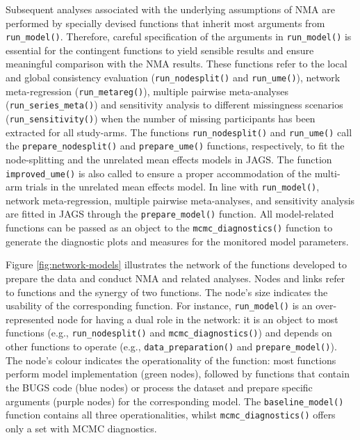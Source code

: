 Subsequent analyses associated with the underlying assumptions of NMA are performed by specially devised functions that inherit most arguments from \texttt{run\_model()}. Therefore, careful specification of the arguments in \texttt{run\_model()} is essential for the contingent functions to yield sensible results and ensure meaningful comparison with the NMA results. These functions refer to the local and global
consistency evaluation (\texttt{run\_nodesplit()} and \texttt{run\_ume()}), network meta-regression (\texttt{run\_metareg()}), multiple pairwise meta-analyses (\texttt{run\_series\_meta()}) and sensitivity analysis to different missingness scenarios (\texttt{run\_sensitivity()}) when the number of missing participants has been extracted for all study-arms. The functions \texttt{run\_nodesplit()} and \texttt{run\_ume()} call the \texttt{prepare\_nodesplit()} and \texttt{prepare\_ume()} functions, respectively, to fit the node-splitting and the unrelated mean effects models in JAGS. The function \texttt{improved\_ume()} is also called to ensure a proper accommodation of the multi-arm trials in the unrelated mean effects model. In line with \texttt{run\_model()}, network meta-regression, multiple pairwise meta-analyses, and sensitivity analysis are fitted in JAGS through the \texttt{prepare\_model()} function. All model-related functions can be passed as an object to the \texttt{mcmc\_diagnostics()} function to generate the diagnostic plots and measures for the monitored model
parameters.

Figure \ref{fig:network-models} illustrates the network of the functions developed to prepare the data and conduct NMA and related analyses. Nodes and links refer to functions and the synergy of two functions. The node's size indicates the usability of the corresponding function. For instance, \texttt{run\_model()} is an over-represented node for having a dual role in the network: it is an object to most functions (e.g., \texttt{run\_nodesplit()} and \texttt{mcmc\_diagnostics()}) and depends on other functions to operate (e.g., \texttt{data\_preparation()} and \texttt{prepare\_model()}). The node's colour indicates the operationality of the function: most functions perform model implementation (green nodes), followed by functions that contain the BUGS code (blue nodes) or process the dataset and prepare specific arguments (purple nodes) for the corresponding model. The \texttt{baseline\_model()} function contains all three operationalities, whilst \texttt{mcmc\_diagnostics()} offers only a set with MCMC diagnostics.

